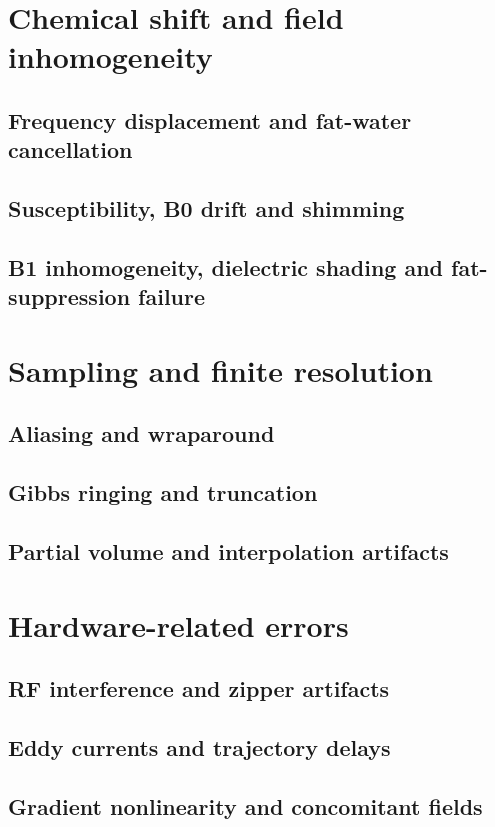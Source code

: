\section{Chemical shift and field inhomogeneity}
\label{sec:22:chemical-shift-and-field-inhomogeneity}
\subsection{Frequency displacement and fat-water cancellation}
\subsection{Susceptibility, B0 drift and shimming}
\subsection{B1 inhomogeneity, dielectric shading and fat-suppression failure}

\section{Sampling and finite resolution}
\label{sec:22:sampling-and-finite-resolution}
\subsection{Aliasing and wraparound}
\subsection{Gibbs ringing and truncation}
\subsection{Partial volume and interpolation artifacts}

\section{Hardware-related errors}
\label{sec:22:hardware-related-errors}
\subsection{RF interference and zipper artifacts}
\subsection{Eddy currents and trajectory delays}
\subsection{Gradient nonlinearity and concomitant fields}


